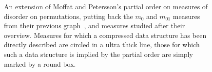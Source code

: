 \begin{figure}
\caption{An extension of Moffat and Petersson's partial order \cite{1992-ACJ-AnOverviewOfAdaptiveSorting-MoffatPetersson} on measures of disorder on permutations, putting back the $m_0$ and $m_{01}$ measures from their previous graph~\cite{1995-DAM-AFrameworkForAdaptiveSorting-PeterssonMoffat}, and measures studied after their overview. Measures for which a compressed data structure has been directly described are \cite{2013-IanFest-FromTimeToSpace-Barbay,2013-TCS-CompressedRepresentationsOfPermutationsAndApplications-BarbayNavarro,2010-ISAAC-AlphabetPartitioningForCompressedRankSelectAndApplications-BarbayGagieNavarroNekrich,2014-Algorithmica-EfficientFullyCompressedSequenceRepresentations-BarbayClaudeGagieNavarroNekrich} circled in a ultra thick line, those for which such a data structure is implied by the partial order are simply marked by a round box.}
\label{fig:MeasuresOfDisorder}
\end{figure}

